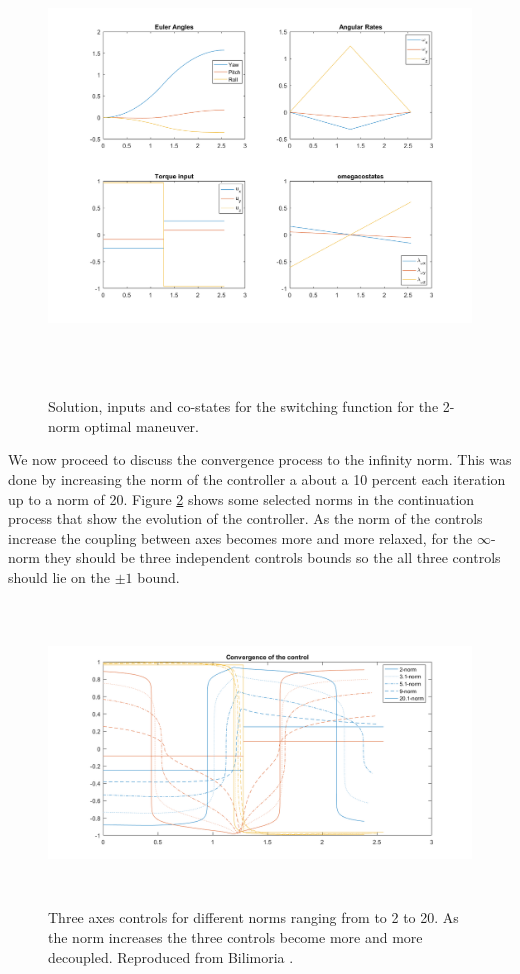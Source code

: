 \begin{figure}[H]
	\centering
	\includegraphics[height=12cm,keepaspectratio]{media/l2Maneuver.png}
	\caption{Solution, inputs and co-states for the switching function for the 2-norm optimal maneuver.}
	\label{fig:l2Maneuver}
\end{figure}

We now proceed to discuss the convergence process to the infinity norm. This was done by increasing the norm of the controller a about a 10 percent each iteration up to a norm of 20. Figure \ref{fig:lConvergence} shows some selected norms in the continuation process that show the evolution of the controller. As the norm of the controls increase the coupling between axes becomes more and more relaxed, for the $\infty$-norm they should be three independent controls bounds so the all three controls should lie on the $\pm1$ bound.

\begin{figure}[h]
	\centering
	\includegraphics[height=8cm,keepaspectratio]{media/controlConvergence.png}
	\caption{Three axes controls for different norms ranging from to 2 to 20. As the norm increases the three controls become more and more decoupled. Reproduced from Bilimoria \cite{bilimoria1993time}.}
	\label{fig:lConvergence}
\end{figure}

